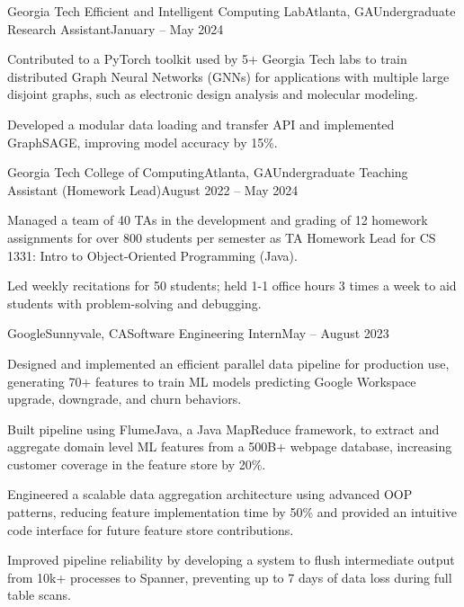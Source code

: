 \documentclass{article}
\begin{document}
\begin{flushleft}
    \begin{experience}{Georgia Tech Efficient and Intelligent Computing Lab}{Atlanta, GA}{Undergraduate Research Assistant}{January -- May 2024}
        \item Contributed to a PyTorch toolkit used by 5+ Georgia Tech labs to train distributed Graph Neural Networks (GNNs) for applications with multiple large disjoint graphs, such as electronic design analysis and molecular modeling.
        \item Developed a modular data loading and transfer API and implemented GraphSAGE, improving model accuracy by 15\%.
    \end{experience}

    \begin{experience}{Georgia Tech College of Computing}{Atlanta, GA}{Undergraduate Teaching Assistant (Homework Lead)}{August 2022 -- May 2024}
        \item Managed a team of 40 TAs in the development and grading of 12 homework assignments for over 800 students per semester as TA Homework Lead for CS 1331: Intro to Object-Oriented Programming (Java).
        \item Led weekly recitations for 50 students; held 1-1 office hours 3 times a week to aid students with problem-solving and debugging.
    \end{experience}

    \begin{experience}{Google}{Sunnyvale, CA}{Software Engineering Intern}{May -- August 2023}
        \item Designed and implemented an efficient parallel data pipeline for production use, generating 70+ features to train ML models predicting Google Workspace upgrade, downgrade, and churn behaviors.
        \item Built pipeline using FlumeJava, a Java MapReduce framework, to extract and aggregate domain level ML features from a 500B+ webpage database, increasing customer coverage in the feature store by 20\%.
        \item Engineered a scalable data aggregation architecture using advanced OOP patterns, reducing feature implementation time by 50\% and provided an intuitive code interface for future feature store contributions.
        \item Improved pipeline reliability by developing a system to flush intermediate output from 10k+ processes to Spanner, preventing up to 7 days of data loss during full table scans.
    \end{experience}


\end{flushleft}
\end{document}
